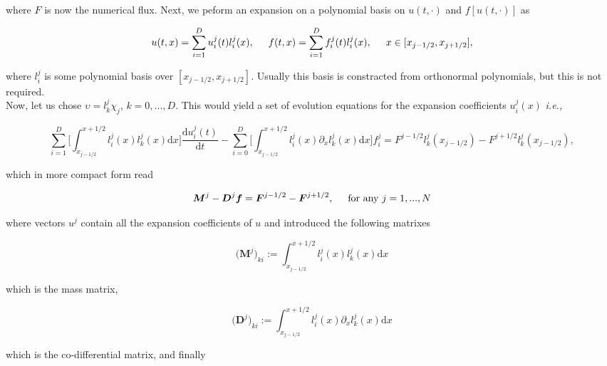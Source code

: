 \documentclass[11pt,a4paper,headinclude=true,DIV=14,BCOR=8mm,chapterprefix,listof=totoc,twoside,openright,abstracton]{scrbook}
\begin{document}
where $F$ is now the numerical flux. Next, we peform an expansion on a polynomial basis on $u(t,\cdot)$ and $f[u(t,\cdot)]$ as

\begin{equation}
    u(t,x) = \sum_{i=1}^{D}u_{i}^{j}(t)l_{i}^{j}(x), \hspace{5mm} f(t,x) = \sum_{i=1}^{D}f_{i}^{j}(t)l_{i}^{j}(x), \hspace{5mm} x\in[x_{j-1/2}, x_{j+1/2}],
\end{equation}

where $l_{i}^{j}$ is some polynomial basis over $[x_{j-1/2}, x_{j+1/2}]$. Usually this basis is constracted from orthonormal polynomials, but this is not required. \\
Now, let us chose $\upsilon = l_{k}^{j}\chi_j$, $k=0,...,D$. This would yield a set of evolution equations for the expansion coefficients $u_{i}^{j}(x)$ \textit{i.e.,}

\begin{equation}
    \sum_{i=1}^{D}\Bigg[\int_{x_{j-1/2}}^{x+1/2}l_{i}^{j}(x)l_{k}^{j}(x)\text{d}x\Bigg]\frac{\text{d}u_{i}^{j}(t)}{\text{d}t} - \sum_{i=0}^{D}\Bigg[ \int_{x_{j-1/2}}^{x+1/2}l_{i}^{j}(x)\partial_{x}l_{k}^{j}(x)\text{d}x \Bigg]f_{i}^{j} = F^{j-1/2}l_{k}^{j}(x_{j-1/2}) - F^{j+1/2}l_{k}^{j}(x_{j-1/2}),
\end{equation}

which in more compact form read

\begin{equation}
    \boldsymbol{M}^{j} - \boldsymbol{D}^{j}\boldsymbol{f} = \boldsymbol{F}^{j-1/2} - \boldsymbol{F}^{j+1/2}, \hspace{5mm} \text{for any } j=1,...,N
\end{equation}

where vectors $u^{j}$ contain all the expansion coefficients of $u$ and introduced the following matrixes

\begin{equation}
    \big(\boldsymbol{M}^j\big)_{ki} := \int_{x_{j-1/2}}^{x+1/2}l_{i}^{j}(x)l_{k}^{j}(x)\text{d}x
\end{equation}

which is the mass matrix, 

\begin{equation}
    \big(\boldsymbol{D}^{j}\big)_{ki} := \int_{x_{j-1/2}}^{x+1/2}l_{i}^{j}(x)\partial_{x}l_{k}^{j}(x)\text{d}x
\end{equation}

which is the co-differential matrix, and finally 
\end{document}
